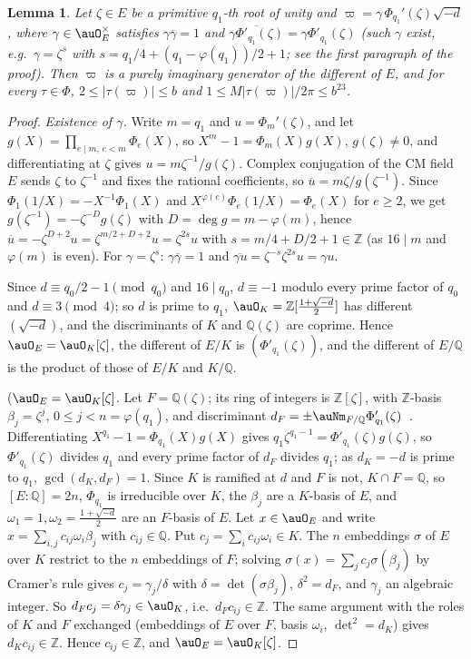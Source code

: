 \documentclass[10pt]{amsart}
\newtheorem{lemma}[theorem]{Lemma}
\theoremstyle{definition}
\theoremstyle{remark}
\newcommand{\Z}{\mathbb Z}
\newcommand{\Q}{\mathbb Q}
\providecommand{\auPl}{\Phi}
\providecommand{\aubar}[1]{\overline{#1}}
\begin{document}
\begin{lemma}\label{pds:kappa}
Let $\zeta\in E$ be a primitive $q_1$-th root of unity and $\varpi=\gamma\,\Phi_{q_1}'(\zeta)\sqrt{-d}$,
where $\gamma\in\auO_E^\times$ satisfies $\gamma\aubar\gamma=1$ and $\aubar{\gamma\Phi'_{q_1}(\zeta)}=
\gamma\Phi'_{q_1}(\zeta)$ \textup{(}such $\gamma$ exist, e.g.\ $\gamma=\zeta^s$ with
$s=q_1/4+(q_1-\varphi(q_1))/2+1$; see the first paragraph of the proof\textup{)}. Then $\varpi$ is a purely imaginary generator of the different of $E$, and
for every $\tau\in\auPl$, $2\le|\tau(\varpi)|\le b$ and $1\le M|\tau(\varpi)|/2\pi\le b^{23}$.
\end{lemma}
\begin{proof}
\emph{Existence of $\gamma$.} Write $m=q_1$ and $u=\Phi_m'(\zeta)$, and let $g(X)=\prod_{e\mid m,\,e<m}
\Phi_e(X)$, so $X^m-1=\Phi_m(X)g(X)$, $g(\zeta)\ne0$, and differentiating at $\zeta$ gives
$u=m\zeta^{-1}/g(\zeta)$. Complex conjugation of the CM field $E$ sends $\zeta$ to $\zeta^{-1}$ and
fixes the rational coefficients, so $\aubar u=m\zeta/g(\zeta^{-1})$. Since $\Phi_1(1/X)=-X^{-1}\Phi_1(X)$
and $X^{\varphi(e)}\Phi_e(1/X)=\Phi_e(X)$ for $e\ge2$, we get $g(\zeta^{-1})=-\zeta^{-D}g(\zeta)$ with
$D=\deg g=m-\varphi(m)$, hence $\aubar u=-\zeta^{D+2}u=\zeta^{m/2+D+2}u=\zeta^{2s}u$ with
$s=m/4+D/2+1\in\mathbb Z$ (as $16\mid m$ and $\varphi(m)$ is even). For $\gamma=\zeta^s$:
$\gamma\aubar\gamma=1$ and $\aubar{\gamma u}=\zeta^{-s}\zeta^{2s}u=\gamma u$.

Since $d\equiv q_0/2-1\pmod{q_0}$ and $16\mid q_0$, $d\equiv-1$ modulo every prime factor of $q_0$ and
$d\equiv3\pmod 4$; so $d$ is prime to $q_1$, $\auO_K=\Z[\frac{1+\sqrt{-d}}2]$ has different
$(\sqrt{-d})$, and the discriminants of $K$ and $\Q(\zeta)$ are coprime. Hence $\auO_E=\auO_K[\zeta]$,
the different of $E/K$ is $(\Phi'_{q_1}(\zeta))$, and the different of $E/\Q$ is the product of those of
$E/K$ and $K/\Q$.

(\emph{$\auO_E=\auO_K[\zeta]$.} Let $F=\Q(\zeta)$; its ring of integers is $\Z[\zeta]$, with
$\Z$-basis $\beta_j=\zeta^{j}$, $0\le j<n=\varphi(q_1)$, and discriminant $d_F=\pm\auNm_{F/\Q}
\Phi'_{q_1}(\zeta)$~\cite[Chapter~I, \S2 and Proposition~(10.2)]{Neukirch}. Differentiating $X^{q_1}-1=\Phi_{q_1}(X)g(X)$ gives
$q_1\zeta^{q_1-1}=\Phi'_{q_1}(\zeta)g(\zeta)$, so $\Phi'_{q_1}(\zeta)$ divides $q_1$ and every prime
factor of $d_F$ divides $q_1$; as $d_K=-d$ is prime to $q_1$, $\gcd(d_K,d_F)=1$. Since $K$ is ramified
at $d$ and $F$ is not, $K\cap F=\Q$, so $[E:\Q]=2n$, $\Phi_{q_1}$ is irreducible over $K$, the
$\beta_j$ are a $K$-basis of $E$, and $\omega_1=1,\omega_2=\frac{1+\sqrt{-d}}2$ are an $F$-basis
of $E$. Let $x\in\auO_E$ and write $x=\sum_{i,j}c_{ij}\omega_i\beta_j$ with $c_{ij}\in\Q$. Put
$c_j=\sum_ic_{ij}\omega_i\in K$. The $n$ embeddings $\sigma$ of $E$ over $K$ restrict to the $n$
embeddings of $F$; solving $\sigma(x)=\sum_jc_j\sigma(\beta_j)$ by Cramer's rule gives
$c_j=\gamma_j/\delta$ with $\delta=\det(\sigma\beta_j)$, $\delta^2=d_F$, and $\gamma_j$ an algebraic
integer. So $d_Fc_j=\delta\gamma_j\in\auO_K$, i.e.\ $d_Fc_{ij}\in\Z$. The same argument with the
roles of $K$ and $F$ exchanged (embeddings of $E$ over $F$, basis $\omega_i$, $\det^2=d_K$) gives
$d_Kc_{ij}\in\Z$. Hence $c_{ij}\in\Z$, and $\auO_E=\auO_K[\zeta]$.


\end{proof}
\end{document}
